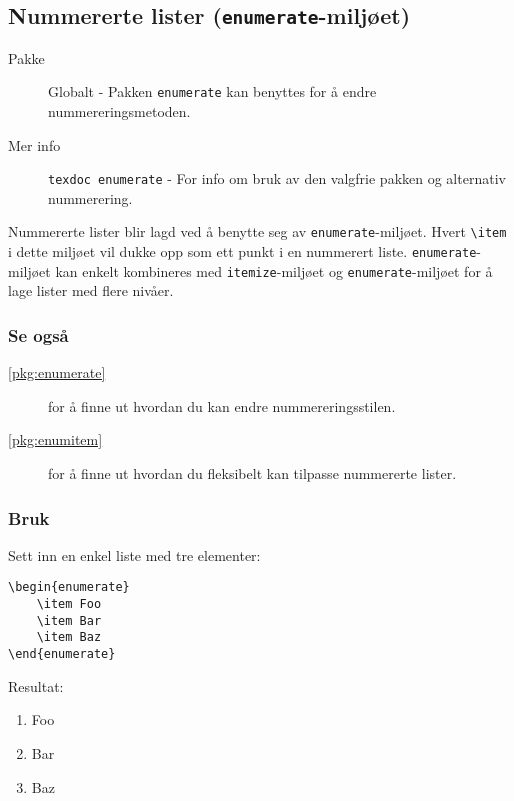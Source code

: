 \subsection{Nummererte lister (\texttt{enumerate}-miljøet)}
\label{env:enumerate}
\begin{description}
    \item[Pakke] Globalt - Pakken \texttt{enumerate} kan benyttes for å endre nummereringsmetoden.
    \item[Mer info] \texttt{texdoc enumerate} - For info om bruk av den valgfrie pakken og alternativ nummerering.
\end{description}

Nummererte lister blir lagd ved å benytte seg av \texttt{enumerate}-miljøet.
Hvert \texttt{\textbackslash item} i dette miljøet vil dukke opp som ett punkt i en nummerert liste.
\texttt{enumerate}-miljøet kan enkelt kombineres med \texttt{itemize}-miljøet og \texttt{enumerate}-miljøet for å lage lister med flere nivåer.

\subsubsection*{Se også}
\begin{description}
    \item[\ref{pkg:enumerate}~] for å finne ut hvordan du kan endre nummereringsstilen.
    \item[\ref{pkg:enumitem}~] for å finne ut hvordan du fleksibelt kan tilpasse nummererte lister.
\end{description}

\subsubsection*{Bruk}
Sett inn en enkel liste med tre elementer:
\vspace{0.75em}
\begin{lstlisting}[language=Tex]
\begin{enumerate}
    \item Foo
    \item Bar
    \item Baz
\end{enumerate}
\end{lstlisting}
\noindent Resultat:
\begin{enumerate}
    \item Foo
    \item Bar
    \item Baz
\end{enumerate}
\vspace{0.75em}


